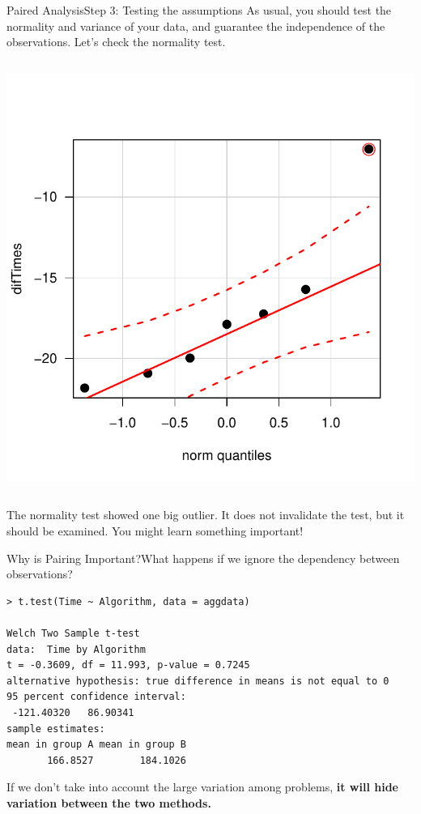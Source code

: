 \begin{frame}[fragile]{Paired Analysis}{Step 3: Testing the assumptions}
  As usual, you should test the normality and variance of your data, and guarantee the independence of the observations. Let's check the normality test.
  \begin{columns}
{}
\includegraphics[width=.8\textwidth]{../img/soltimesqq.pdf}
\end{columns}
The normality test showed one big outlier. It does not invalidate the test, but
it should be examined. You might learn something important!
\end{frame}




\begin{frame}[fragile]{Why is Pairing Important?}{What happens if we ignore the dependency between observations?}
{\smaller
\begin{verbatim}
> t.test(Time ~ Algorithm, data = aggdata)

Welch Two Sample t-test
data:  Time by Algorithm
t = -0.3609, df = 11.993, p-value = 0.7245
alternative hypothesis: true difference in means is not equal to 0
95 percent confidence interval:
 -121.40320   86.90341
sample estimates:
mean in group A mean in group B
       166.8527        184.1026
\end{verbatim}}

If we don't take into account the large variation among problems, {\bf it will hide
variation between the two methods.}

\end{frame}

